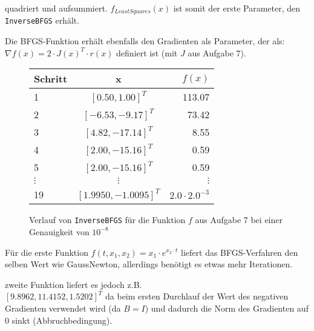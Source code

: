 \documentclass[a4paper, 12pt]{report}
\begin{document}
quadriert und aufsummiert. $f_{LeastSquares}(x)$ ist somit der erste Parameter, den\\
\lstinline[basicstyle=\ttfamily\color{black}]|InverseBFGS| erhält.\par
Die BFGS-Funktion erhält ebenfalls den Gradienten als Parameter, der als: $\nabla f(x) = 2\cdot J(x)^T\cdot r(x)$ definiert ist (mit $J$ aus Aufgabe 7).

\begin{figure}[H]
  \centering
  \def\arraystretch{1.25}
  \begin{tabular}{l|c|r}
    \hline
    \textbf{Schritt} & \textbf{x} & \textbf{$f(x)$}\\
    \hline
    1 & $[0.50, 1.00]^T$ & 113.07\\
    2 & $[-6.53, -9.17]^T$ & 73.42\\
    3 & $[4.82, -17.14]^T$ & 8.55\\
    4 & $[2.00, -15.16]^T$ & 0.59\\
    5 & $[2.00, -15.16]^T$ & 0.59\\
    $\vdots$ & $\vdots$ & $\vdots$\\
    19 & $[1.9950, -1.0095]^T$ & $2.0\cdot 2.0^{-3}$\\
    \hline
  \end{tabular}
  \caption{Verlauf von \lstinline[basicstyle=\ttfamily\color{black}]|InverseBFGS| für die Funktion $f$ aus Aufgabe 7 bei einer Genauigkeit von
          $10^{-8}$}
\end{figure}

Für die erste Funktion $f(t, x_1, x_2) = x_1\cdot e^{x_2\cdot t}$ liefert das BFGS-Verfahren den selben Wert wie GaussNewton, allerdings
benötigt es etwas mehr Iterationen.



zweite Funktion liefert es jedoch z.B.\\
$[9.8962, 11.4152, 1.5202]^T$ da beim ersten Durchlauf der Wert des negativen Gradienten
verwendet wird (da $B = I$) und dadurch die Norm des Gradienten auf 0 sinkt (Abbruchbedingung).
\end{document}
